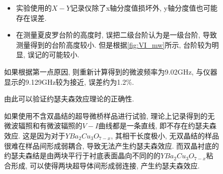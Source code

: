 \documentclass[font=default]{mpltx}
\newcommand{\note}[1]{{\color{gray}#1}}
\newcommand*\cs[1]{\texttt{\textbackslash #1}}
\newcommand*\env[1]{\textit{\texttt{#1}}}
\begin{document}
\begin{figure}[h]
\begin{itemize}
    \item 实验使用的$X-Y$记录仪除了x轴分度值损坏外, y轴分度值也可能存在误差.
    \item 在测量夏皮罗台阶的高度时, 误把二级台阶认为是一级台阶, 导致测量得到的台阶高度较小. 但是根据\autoref{fig:VI_mw}所示, 台阶较为明显, 误记的可能较小. 
  \end{itemize}
  如果根据第一点原因, 则重新计算得到的微波频率为9.02GHz, 与仪器显示的9.129GHz较为接近, 误差约为1.2\%. 
  \par
  由此可以验证约瑟夫森效应理论的正确性.
  \par
  如果使用不含双晶结的超导微桥样品进行试验, 理论上记录得到的无微波辐照和有微波辐照的$V-I$曲线都是一条直线, 即不存在约瑟夫森效应.
  这是因为对于$YBa_2Cu_3O_{7-x}$, 其相干长度极小, 无双晶结的样品很难在样品间形成弱耦合, 导致无法产生约瑟夫森效应. 
  而双晶衬底的约瑟夫森结是由两块平行于衬底表面晶向不同的的$YBa_2Cu_3O_{7-x}$粘合形成, 可以使得两块超导体间形成弱连接, 产生约瑟夫森效应.









\end{figure}
\end{document}
